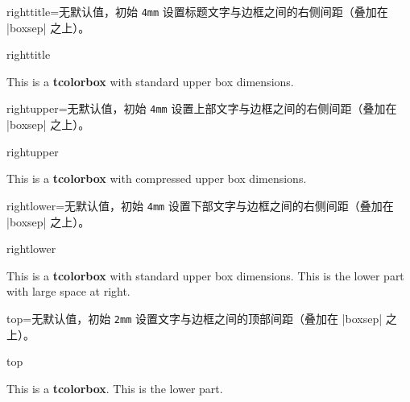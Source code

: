 \begin{docTcbKey}{righttitle}{=}{无默认值，初始 \texttt{4mm}}
  设置标题文字与边框之间的右侧间距（叠加在 |boxsep| 之上）。
\begin{exdispExample}{righttitle}

\begin{tcolorbox}[width=5cm,righttitle=2cm,title=My very long title text]
This is a \textbf{tcolorbox} with standard upper box dimensions.
\end{tcolorbox}
\end{exdispExample}
\end{docTcbKey}


\begin{docTcbKey}{rightupper}{=}{无默认值，初始 \texttt{4mm}}
  设置上部文字与边框之间的右侧间距（叠加在 |boxsep| 之上）。
\begin{exdispExample}{rightupper}

\begin{tcolorbox}[width=5cm,rightupper=2cm,title=My very long title text]
This is a \textbf{tcolorbox} with compressed upper box dimensions.
\end{tcolorbox}
\end{exdispExample}
\end{docTcbKey}


\clearpage
\begin{docTcbKey}{rightlower}{=}{无默认值，初始 \texttt{4mm}}
  设置下部文字与边框之间的右侧间距（叠加在 |boxsep| 之上）。
\begin{exdispExample}{rightlower}

\begin{tcolorbox}[width=5cm,rightlower=2cm]
This is a \textbf{tcolorbox} with standard upper box dimensions.
\tcblower
This is the lower part with large space at right.
\end{tcolorbox}
\end{exdispExample}
\end{docTcbKey}



\begin{docTcbKey}{top}{=}{无默认值，初始 \texttt{2mm}}
  设置文字与边框之间的顶部间距（叠加在 |boxsep| 之上）。
\begin{exdispExample}{top}

\begin{tcolorbox}[top=0mm]
This is a \textbf{tcolorbox}.
\tcblower
This is the lower part.
\end{tcolorbox}
\end{exdispExample}
\end{docTcbKey}


